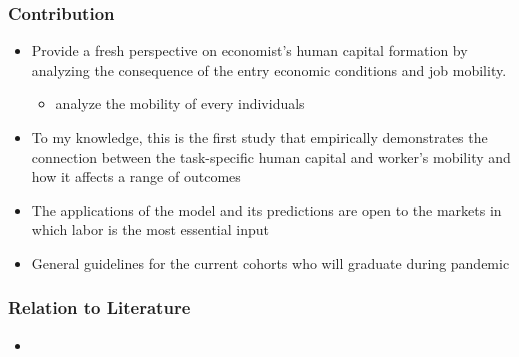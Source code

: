 \documentclass[11pt]{beamer}
\begin{document}
\begin{frame}
	\frametitle{Contribution} 
	\begin{itemize}
		\item Provide a fresh perspective on economist’s human capital formation by analyzing the consequence of the entry economic conditions and job mobility.
		\begin{itemize}
			\item analyze the mobility of every individuals
		\end{itemize}
		\item To my knowledge, this is the first study that empirically demonstrates the connection between the task-specific human capital and worker’s mobility and how it affects a range of outcomes
		\item The applications of the model and its predictions are open to the markets in which labor is the most essential input
		\item General guidelines for the current cohorts who will graduate during pandemic
		
	\end{itemize}
\end{frame}


\begin{frame}
	\frametitle{Relation to Literature} 
	\begin{itemize}
		\item 
	\end{itemize}
\end{frame}
\end{document}
